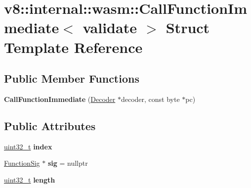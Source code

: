 \hypertarget{structv8_1_1internal_1_1wasm_1_1CallFunctionImmediate}{}\section{v8\+:\+:internal\+:\+:wasm\+:\+:Call\+Function\+Immediate$<$ validate $>$ Struct Template Reference}
\label{structv8_1_1internal_1_1wasm_1_1CallFunctionImmediate}
\subsection*{Public Member Functions}
\begin{DoxyCompactItemize}
\item 
\mbox{\label{structv8_1_1internal_1_1wasm_1_1CallFunctionImmediate_a20227376202de546f57473e7b663e7f3}} 
{\bfseries Call\+Function\+Immediate} (\mbox{\hyperlink{classv8_1_1internal_1_1wasm_1_1Decoder}{Decoder}} $\ast$decoder, const byte $\ast$pc)
\end{DoxyCompactItemize}
\subsection*{Public Attributes}
\begin{DoxyCompactItemize}
\item 
\mbox{\label{structv8_1_1internal_1_1wasm_1_1CallFunctionImmediate_a32d52cb319918d59d1876f216557f096}} 
\mbox{\hyperlink{classuint32__t}{uint32\+\_\+t}} {\bfseries index}
\item 
\mbox{\label{structv8_1_1internal_1_1wasm_1_1CallFunctionImmediate_a735afb98d4615830b5741c187fbeec4f}} 
\mbox{\hyperlink{classv8_1_1internal_1_1Signature}{Function\+Sig}} $\ast$ {\bfseries sig} = nullptr
\item 
\mbox{\label{structv8_1_1internal_1_1wasm_1_1CallFunctionImmediate_ae9d1cc7a0118d2d0ba3334f864dbd996}} 
\mbox{\hyperlink{classuint32__t}{uint32\+\_\+t}} {\bfseries length}
\end{DoxyCompactItemize}


